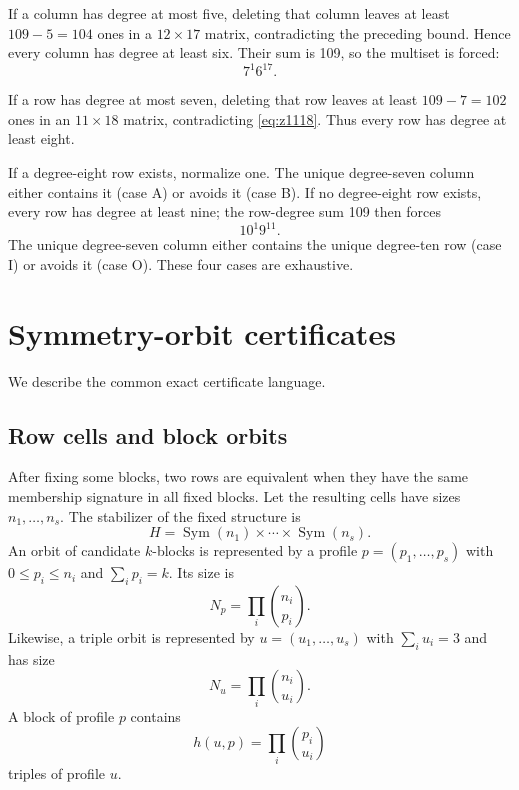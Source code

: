 \documentclass[11pt]{article}
\begin{document}
If a column has degree at most five, deleting that column leaves at least $109-5=104$ ones in a $12\times17$ matrix, contradicting the preceding bound. Hence every column has degree at least six. Their sum is 109, so the multiset is forced:
\begin{equation}
7^1 6^{17}.
\label{eq:colprofile}
\end{equation}

If a row has degree at most seven, deleting that row leaves at least $109-7=102$ ones in an $11\times18$ matrix, contradicting \eqref{eq:z1118}. Thus every row has degree at least eight.

If a degree-eight row exists, normalize one. The unique degree-seven column either contains it (case A) or avoids it (case B). If no degree-eight row exists, every row has degree at least nine; the row-degree sum 109 then forces
\begin{equation}
10^1 9^{11}.
\label{eq:rowprofile}
\end{equation}
The unique degree-seven column either contains the unique degree-ten row (case I) or avoids it (case O). These four cases are exhaustive.

\section{Symmetry-orbit certificates}
We describe the common exact certificate language.

\subsection{Row cells and block orbits}
After fixing some blocks, two rows are equivalent when they have the same membership signature in all fixed blocks. Let the resulting cells have sizes $n_1,\ldots,n_s$. The stabilizer of the fixed structure is
\[
H=\operatorname{Sym}(n_1)\times\cdots\times\operatorname{Sym}(n_s).
\]
An orbit of candidate $k$-blocks is represented by a profile $p=(p_1,\ldots,p_s)$ with $0\le p_i\le n_i$ and $\sum_i p_i=k$. Its size is
\begin{equation}
N_p=\prod_i\binom{n_i}{p_i}.
\end{equation}
Likewise, a triple orbit is represented by $u=(u_1,\ldots,u_s)$ with $\sum_i u_i=3$ and has size
\[
N_u=\prod_i\binom{n_i}{u_i}.
\]
A block of profile $p$ contains
\begin{equation}
h(u,p)=\prod_i\binom{p_i}{u_i}
\label{eq:h}
\end{equation}
triples of profile $u$.
\end{document}
